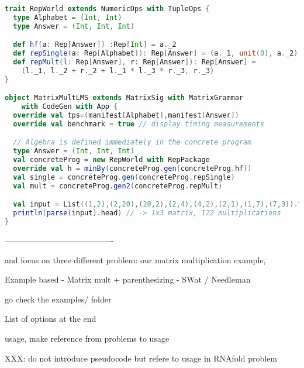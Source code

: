 \begin{lstlisting}[language=Scala,captionpos=none]
trait RepWorld extends NumericOps with TupleOps {
  type Alphabet = (Int, Int)
  type Answer = (Int, Int, Int)

  def hf(a: Rep[Answer]) :Rep[Int] = a._2
  def repSingle(a: Rep[Alphabet]): Rep[Answer] = (a._1, unit(0), a._2)
  def repMult(l: Rep[Answer], r: Rep[Answer]): Rep[Answer] =
    (l._1, l._2 + r._2 + l._1 * l._3 * r._3, r._3)
}

object MatrixMultLMS extends MatrixSig with MatrixGrammar
    with CodeGen with App {
  override val tps=(manifest[Alphabet],manifest[Answer])
  override val benchmark = true // display timing measurements

  // Algebra is defined immediately in the concrete program
  type Answer = (Int, Int, Int)
  val concreteProg = new RepWorld with RepPackage
  override val h = minBy(concreteProg.gen(concreteProg.hf))
  val single = concreteProg.gen(concreteProg.repSingle)
  val mult = concreteProg.gen2(concreteProg.repMult)

  val input = List((1,2),(2,20),(20,2),(2,4),(4,2),(2,1),(1,7),(7,3)).toArray
  println(parse(input).head) // -> 1x3 matrix, 122 multiplications
}
\end{lstlisting}

\newpage
----------------------------------------



 and focus on three different problem: our matrix multiplication example, 

Example based
- Matrix mult + parenthesizing
- SWat / Needleman

go check the examples/ folder

List of options at the end



{\color{red} usage, make reference from problems to usage

XXX: do not introduce pseudocode but refere to usage in RNAfold problem

}


